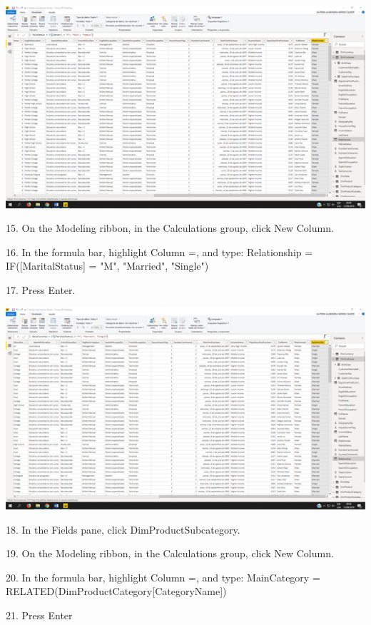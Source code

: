 \begin{center}
\includegraphics[width=15cm]{./Imagenes/img27} 
\end{center}
\item 15. On the Modeling ribbon, in the Calculations group, click New Column.
\item 16. In the formula bar, highlight Column =, and type:
Relationship = IF([MaritalStatus] = "M", "Married", "Single")
\item 17. Press Enter.

\begin{center}
\includegraphics[width=15cm]{./Imagenes/img28} 
\end{center}

\item 18. In the Fields pane, click DimProductSubcategory.
\item 19. On the Modeling ribbon, in the Calculations group, click New Column.
\item 20. In the formula bar, highlight Column =, and type:
MainCategory = RELATED(DimProductCategory[CategoryName])
\item 21. Press Enter

